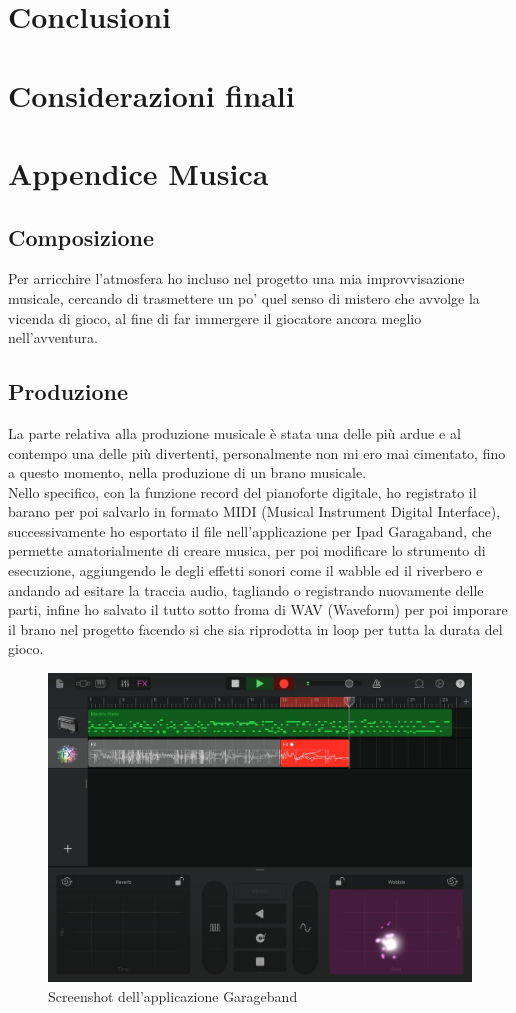 \documentclass[italian,12pt,a4paper]{article}
\begin{document}
	\section{Conclusioni}

	\section{Considerazioni finali}
	
	\appendix
	
	\renewcommand{\thesection}{\Roman{section}}
	\section{Appendice Musica}\label{appendix:musica}
	\subsection{Composizione}
	
	Per arricchire l'atmosfera ho incluso nel progetto una mia improvvisazione musicale, cercando di trasmettere un po' quel senso di mistero che avvolge la vicenda di gioco, al fine di far immergere il giocatore ancora meglio nell'avventura.
	
	\subsection{Produzione}
	La parte relativa alla produzione musicale è stata una delle più ardue e al contempo una delle più divertenti, personalmente non mi ero mai cimentato, fino a questo momento, nella produzione di un brano musicale.\\
	\linebreak
	Nello specifico, con la funzione record del pianoforte digitale, ho registrato il barano per poi salvarlo in formato MIDI (Musical Instrument Digital Interface), successivamente ho esportato il file nell'applicazione per Ipad Garagaband, che permette amatorialmente di creare musica, per poi modificare lo strumento di esecuzione, aggiungendo le degli effetti sonori come il wabble ed il riverbero e andando ad esitare la traccia audio, tagliando o registrando nuovamente delle parti, infine ho salvato il tutto sotto froma di WAV (Waveform) per poi imporare il brano nel progetto facendo si che sia riprodotta in loop per tutta la durata del gioco. 
	
	\begin{figure}[!h]
		\centering
		\includegraphics[width=14cm]{garageband.jpg}
		\caption{Screenshot dell'applicazione Garageband}
		\label{fig:musica}
	\end{figure}
	
	
\end{document}
